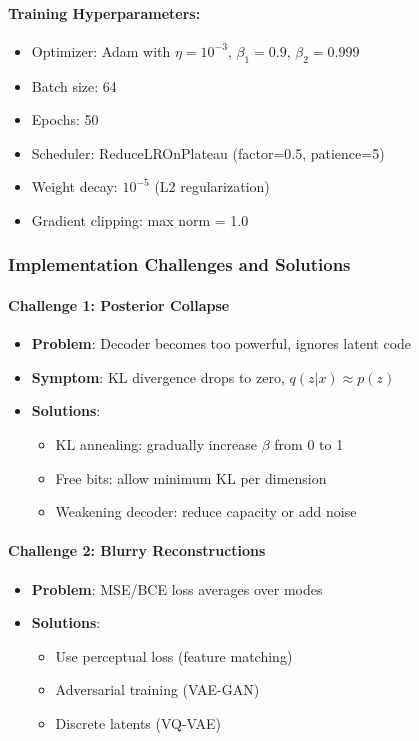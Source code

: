 \documentclass[conference]{IEEEtran}
\begin{document}
\paragraph{Training Hyperparameters:}
\begin{itemize}
    \item Optimizer: Adam with $\eta = 10^{-3}$, $\beta_1 = 0.9$, $\beta_2 = 0.999$
    \item Batch size: 64
    \item Epochs: 50
    \item Scheduler: ReduceLROnPlateau (factor=0.5, patience=5)
    \item Weight decay: $10^{-5}$ (L2 regularization)
    \item Gradient clipping: max norm = 1.0
\end{itemize}

\subsubsection{Implementation Challenges and Solutions}

\paragraph{Challenge 1: Posterior Collapse}
\begin{itemize}
    \item \textbf{Problem}: Decoder becomes too powerful, ignores latent code
    \item \textbf{Symptom}: KL divergence drops to zero, $q(z|x) \approx p(z)$
    \item \textbf{Solutions}: 
    \begin{itemize}
        \item KL annealing: gradually increase $\beta$ from 0 to 1
        \item Free bits: allow minimum KL per dimension
        \item Weakening decoder: reduce capacity or add noise
    \end{itemize}
\end{itemize}

\paragraph{Challenge 2: Blurry Reconstructions}
\begin{itemize}
    \item \textbf{Problem}: MSE/BCE loss averages over modes
    \item \textbf{Solutions}:
    \begin{itemize}
        \item Use perceptual loss (feature matching)
        \item Adversarial training (VAE-GAN)
        \item Discrete latents (VQ-VAE)
    \end{itemize}
\end{itemize}
\end{document}
